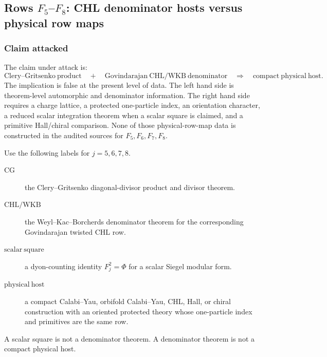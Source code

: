 \subsection{\texorpdfstring{Rows \(F_5\)--\(F_8\): CHL denominator hosts versus physical row maps}
{Rows F5-F8: CHL denominator hosts versus physical row maps}}

\subsubsection*{Claim attacked}

The claim under attack is:
\[
\mathrm{Clery\mbox{--}Gritsenko\ product}
\quad+\quad
\mathrm{Govindarajan\ CHL/WKB\ denominator}
\quad\Longrightarrow\quad
\mathrm{compact\ physical\ host}.
\]
The implication is false at the present level of data.  The left hand
side is theorem-level automorphic and denominator information.  The
right hand side requires a charge lattice, a protected one-particle
index, an orientation character, a reduced scalar integration theorem
when a scalar square is claimed, and a primitive Hall/chiral comparison.
None of those physical-row-map data is constructed in the audited
sources for \(F_5,F_6,F_7,F_8\).

\begin{definition}
Use the following labels for \(j=5,6,7,8\).
\begin{description}
\item[\(\mathrm{CG}\)] the Clery--Gritsenko diagonal-divisor product and
divisor theorem.
\item[\(\mathrm{CHL/WKB}\)] the Weyl--Kac--Borcherds denominator theorem
for the corresponding Govindarajan twisted CHL row.
\item[\(\mathrm{scalar\ square}\)] a dyon-counting identity
\(F_j^2=\Phi\) for a scalar Siegel modular form.
\item[\(\mathrm{physical\ host}\)] a compact Calabi--Yau, orbifold
Calabi--Yau, CHL, Hall, or chiral construction with an oriented
protected theory whose one-particle index and primitives are the same
row.
\end{description}
A scalar square is not a denominator theorem.  A denominator theorem is
not a compact physical host.
\end{definition}

